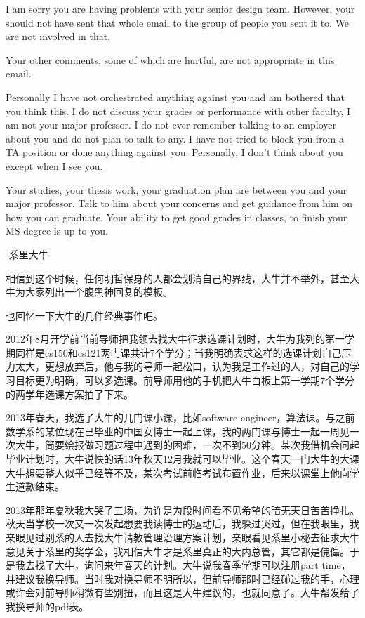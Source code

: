 \documentclass[12pt]{book}
\begin{document}
I am sorry you are having problems with your senior design team. However, your should not have sent that whole email to the group of people you sent it to. We are not involved in that.

Your other comments, some of which are hurtful, are not appropriate in this email.  

Personally I have not orchestrated anything against you and am bothered that you think this. I do not discuss your grades or performance with other faculty, I am not your major professor. I do not ever remember talking to an employer about you and do not plan to talk to any. I have not tried to block you from a TA position or done anything against you. Personally, I don't think about you except when I see you. 

Your studies, your thesis work, your graduation plan are between you and your major professor. Talk to him about your concerns and get guidance from him on how you can graduate.  Your ability to get good grades in classes, to finish your MS degree is up to you.

-系里大牛

相信到这个时候，任何明哲保身的人都会划清自己的界线，大牛并不举外，甚至大牛为大家列出一个腹黑神回复的模板。

也回忆一下大牛的几件经典事件吧。

2012年8月开学前当前导师把我领去找大牛征求选课计划时，大牛为我列的第一学期同样是cs150和cs121两门课共计7个学分；当我明确表求这样的选课计划自己压力太大，更想放弃后，他与我的导师一起松口，认为我是工作过的人，对自己的学习目标更为明确，可以多选课。前导师用他的手机把大牛白板上第一学期7个学分的两学年选课方案拍了下来。

2013年春天，我选了大牛的几门课小课，比如software engineer，算法课。与之前数学系的某位现在已毕业的中国女博士一起上课，我的两门课与博士一起一周见一次大牛，简要绘报做习题过程中遇到的困难，一次不到50分钟。某次我借机会问起毕业计划时，大牛说快的话13年秋天12月我就可以毕业。这个春天一门大牛的大课大牛想要整人似乎已经等不及，某次考试前临考试布置作业，后来以课堂上他向学生道歉结束。

2013年那年夏秋我大哭了三场，为许是为段时间看不见希望的暗无天日苦苦挣扎。秋天当学校一次又一次发起想要我读博士的运动后，我躲过哭过，但在我眼里，我亲眼见过别系的人去找大牛请教管理治理方案计划，亲眼看见系里小秘去征求大牛意见关于系里的奖学金，我相信大牛才是系里真正的大内总管，其它都是傀儡。于是我去找了大牛，询问来年春天的计划。大牛说我春季学期可以注册part time，并建议我换导师。当时我对换导师不明所以，但前导师那时已经碰过我的手，心理或许会对前导师稍微有些别扭，而且这是大牛建议的，也就同意了。大牛帮发给了我换导师的pdf表。
\end{document}
